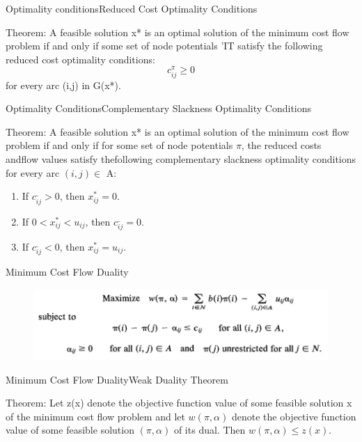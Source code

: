 \documentclass{beamer}
\begin{document}
\begin{frame}{Optimality conditions}{Reduced Cost Optimality Conditions}

    \begin{block}{Theorem: }
      A feasible solution x* is an
      optimal solution of the minimum cost flow problem if and only if some set of node
      potentials 'IT satisfy the following reduced cost optimality conditions:
      $$c_{ij}^{\pi} \geq 0$$
      for every arc (i,j) in G(x*).  
    \end{block}
\end{frame}

\begin{frame}{Optimality Conditions}{Complementary Slackness Optimality Conditions}
\begin{block}{Theorem: }
  A feasible solution x* is an optimal solution of the minimum cost flow problem if and only if for
  some set of node potentials $\pi$, the reduced costs andflow values satisfy thefollowing
  complementary slackness optimality conditions for every arc $(i,j) \in $  A:  
\begin{enumerate}
  \item If $c_{ij}^{\_} > 0 $, then $x_{ij}^{*} = 0$.
  \item If $0 < x_{ij}^{*} < u_{ij}$, then   $c_{ij}^{\_} = 0 $.
  \item If $c_{ij}^{\_} < 0 $, then $x_{ij}^{*} = u_{ij}$. 
\end{enumerate}
\end{block}
\end{frame}

\begin{frame}{Minimum Cost Flow Duality}
\begin{figure}[h!t]
\centering
\includegraphics[scale = 0.75]{minimum_cost_flow_duality.png}
\label{fig: duality}
\end{figure}
\end{frame}

\begin{frame}{Minimum Cost Flow Duality}{Weak Duality Theorem}
\begin{block}{Theorem: }
  Let z(x) denote the objective function
  value of some feasible solution x of the minimum cost flow problem and let $w( \pi, \alpha)$
  denote the objective function value of some feasible solution $( \pi, \alpha)$ of its dual. Then
  $w( \pi, \alpha) \leq z(x)$.
\end{block}
\end{frame}
\end{document}

